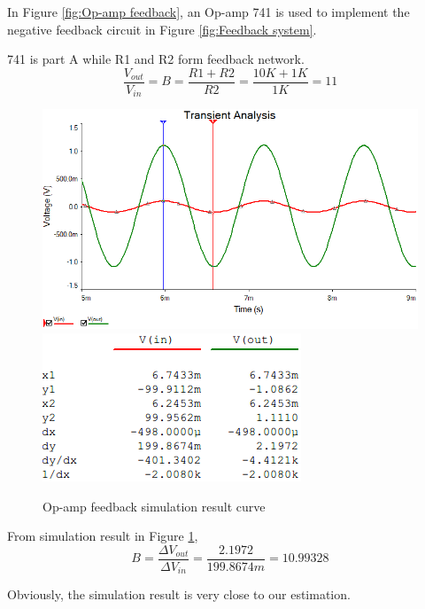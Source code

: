 In Figure \ref{fig:Op-amp feedback}, an Op-amp 741 is used to implement the negative feedback circuit in Figure \ref{fig:Feedback system}.

741 is part A while R1 and R2 form feedback network. 
\[ \frac{V_{out}}{V_{in}} = B = \frac{R1 + R2}{R2} = \frac{10K + 1K}{1K} = 11 \]
 
\begin{figure}[htbp]
	\centering 
	\includegraphics[scale=0.7]{"../Photo/Chap1/Op-amp feedback simulation wave"}\\[0.5cm]
	\includegraphics[scale =1]{"../Photo/Chap1/Op-amp feedback simulation cursor data"}
	\caption{Op-amp  feedback simulation result curve}
	\label{fig:Op-amp  feedback simulation result }
\end{figure}

From simulation result in Figure \ref{fig:Op-amp  feedback simulation result }, 
\[ B = \frac{\Delta V_{out}}{\Delta V_{in}} =  \frac{2.1972}{199.8674m} =  10.99328 \]
 
Obviously, the simulation result is very close to our estimation.



